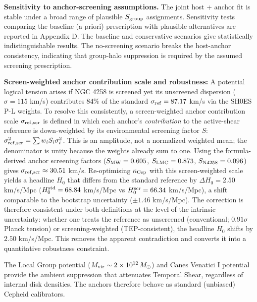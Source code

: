 \documentclass[
]{article}
\begin{document}
\textbf{Sensitivity to anchor-screening assumptions.} The joint host +
anchor fit is stable under a broad range of plausible \(S_{\rm group}\)
assignments. Sensitivity tests comparing the baseline (a priori)
prescription with plausible alternatives are reported in Appendix D. The
baseline and conservative scenarios give statistically indistinguishable
results. The no-screening scenario breaks the host-anchor consistency,
indicating that group-halo suppression is required by the assumed
screening prescription.

\textbf{Screen-weighted anchor contribution scale and robustness:} A
potential logical tension arises if NGC 4258 is screened yet its
unscreened dispersion (\(\sigma = 115\) km/s) contributes 84\% of the
standard \(\sigma_{\rm ref} = 87.17\) km/s via the SH0ES P-L weights. To
resolve this consistently, a screen-weighted anchor contribution scale
\(\sigma_{\rm ref,scr}\) is defined in which each anchor's
\emph{contribution} to the active-shear reference is down-weighted by
its environmental screening factor \(S\):
\(\sigma_{\rm ref,scr}^2 = \sum w_i S_i \sigma_i^2\). This is an
amplitude, not a normalized weighted mean; the denominator is unity
because the weights already sum to one. Using the formula-derived anchor
screening factors (\(S_{\rm MW}=0.605\), \(S_{\rm LMC}=0.873\),
\(S_{\rm N4258}=0.096\)) gives \(\sigma_{\rm ref,scr} \approx 30.51\)
km/s. Re-optimising \(\kappa_{\rm Cep}\) with this screen-weighted scale
yields a headline \(H_0\) that differs from the standard reference by
\(\Delta H_0 = 2.50\) km/s/Mpc (\(H_0^{\rm std} = 68.84\) km/s/Mpc vs
\(H_0^{\rm scr} = 66.34\) km/s/Mpc), a shift comparable to the bootstrap
uncertainty (\(\pm 1.46\) km/s/Mpc). The correction is therefore
consistent under both definitions at the level of the intrinsic
uncertainty: whether one treats the reference as unscreened
(conventional; \(0.91\sigma\) Planck tension) or screening-weighted
(TEP-consistent), the headline \(H_0\) shifts by \(2.50\) km/s/Mpc. This
removes the apparent contradiction and converts it into a quantitative
robustness constraint.

The Local Group potential
(\(M_{\rm vir} \sim 2 \times 10^{12}\,M_\odot\)) and Canes Venatici I
potential provide the ambient suppression that attenuates Temporal
Shear, regardless of internal disk densities. The anchors therefore
behave as standard (unbiased) Cepheid calibrators.
\end{document}
